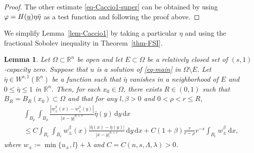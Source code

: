\documentclass{amsart}
\theoremstyle{plain}
\newtheorem{lemma}[theorem]{Lemma}
\theoremstyle{definition}
\numberwithin{equation}{section}
\begin{document}
\begin{proof}
The other estimate \eqref{eq-Caccio1-super} can be obtained by using $\varphi=H(\underbar{$u$})\eta \bar{\eta}$ as a test function and following the proof above.
\end{proof}

We simplify Lemma~\ref{lem-Caccio1} by taking a particular $\eta$ and using the fractional Sobolev inequality in Theorem~\ref{thm-FSI}.

\begin{lemma}\label{lem-Caccio2}
Let $\Omega \subset \mathbb{R}^n$ be open and let $E \subset \Omega$ be a relatively closed set of $(s, 1)$-capacity zero. Suppose that $u$ is a solution of \eqref{eq-main} in $\Omega \setminus E$. Let $\bar{\eta} \in W^{s, 1}(\mathbb{R}^n)$ be a function such that $\bar{\eta}$ vanishes in a neighborhood of $E$ and $0 \leq \bar{\eta} \leq 1$ in $\mathbb{R}^n$. Then, for each $x_0 \in \Omega$, there exists $R \in (0,1)$ such that $B_R=B_R(x_0) \subset \Omega$ and that for any $l, \beta>0$ and $0<\rho<r\leq R$,
\begin{align*}
&\int_{B_\rho} \int_{B_\rho} \frac{|w_\pm^\beta(x) - w_\pm^\beta(y)|}{|x-y|^{n+s}} \bar{\eta}(y) \,\mathrm{d}y \,\mathrm{d}x \\
&\leq C \int_{B_r} \int_{B_r} w_\pm^\beta(x) \frac{|\bar{\eta}(x)-\bar{\eta}(y)|}{|x-y|^{n+s}} \,\mathrm{d}y \,\mathrm{d}x + C(1+\beta) \frac{r}{r-\rho} r^{-s} \int_{B_r} w_\pm^\beta \,\mathrm{d}x,
\end{align*}
where $w_\pm\coloneqq \min\{u_\pm, l\}+\lambda$ and $C=C(n, s, \Lambda, \lambda)>0$.
\end{lemma}
\end{document}
